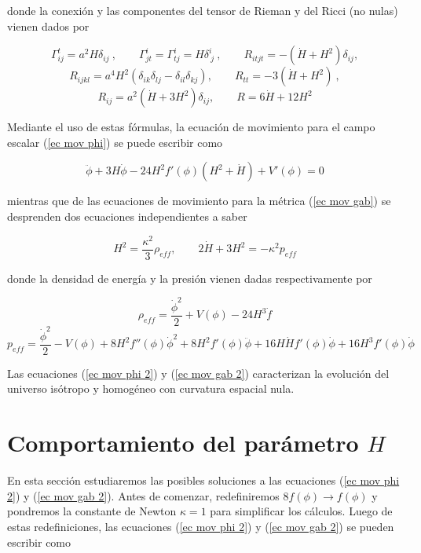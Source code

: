 donde la conexión y las componentes del tensor de Rieman y del Ricci (no nulas) vienen dados por

$$
\Gamma^t_{ij}=a^2 H \delta_{ij}\ ,\qquad
\Gamma^i_{jt}=\Gamma^i_{tj}=H\delta^i_{\ j}\ ,
\qquad R_{itjt}=-\left(\dot H + H^2\right)\delta_{ij},
$$
$$
R_{ijkl}=a^4 H^2\left(\delta_{ik} \delta_{lj} - \delta_{il} \delta_{kj}\right),\qquad
R_{tt}=-3\left(\dot H + H^2\right)\ ,
$$
\begin{equation}\label{wk}
R_{ij}= a^2 \left(\dot H
+ 3H^2\right)\delta_{ij},\qquad R= 6\dot H + 12 H^2
\end{equation}


Mediante el uso de estas fórmulas, la ecuación de movimiento para el campo escalar (\ref{ec mov phi}) se puede escribir como 


\begin{equation}\label{ec mov phi 2}
\ddot{\phi}+3H\dot{\phi}-24H^2 f'(\phi)(H^2+\dot{H})+V'(\phi)=0
\end{equation}


mientras que de las ecuaciones de movimiento para la métrica (\ref{ec mov gab}) se desprenden dos ecuaciones independientes a saber

\begin{equation}\label{ec mov gab 2}
H^2=\frac{\kappa^2}{3}\rho_{eff},\qquad 2\dot{H}+3H^2=-\kappa^2 p_{eff}
\end{equation}

donde la densidad de energía y la presión vienen dadas respectivamente por

$$
\rho_{eff}=\frac{\dot{\phi}^2}{2}+V(\phi)-24 H^3 \dot{f}
$$
$$
p_{eff}=\frac{\dot{\phi}^2}{2}-V(\phi)+8H^2 f''(\phi)\dot{\phi}^2+8H^2 f'(\phi)\ddot{\phi}+16 H\dot{H} f'(\phi)\dot{\phi}+16 H^3 f'(\phi)\dot{\phi}
$$


Las ecuaciones (\ref{ec mov phi 2}) y (\ref{ec mov gab 2}) caracterizan la evolución del universo isótropo y homogéneo con curvatura espacial nula.









    
\section{Comportamiento del parámetro $H$} 


En esta sección estudiaremos las posibles soluciones a las ecuaciones (\ref{ec mov phi 2}) y (\ref{ec mov gab 2}). Antes de comenzar, redefiniremos $8f(\phi)\rightarrow f(\phi)$ y pondremos la constante de Newton $\kappa=1$ para simplificar los cálculos. Luego de estas redefiniciones, las ecuaciones (\ref{ec mov phi 2}) y (\ref{ec mov gab 2}) se pueden escribir como 

